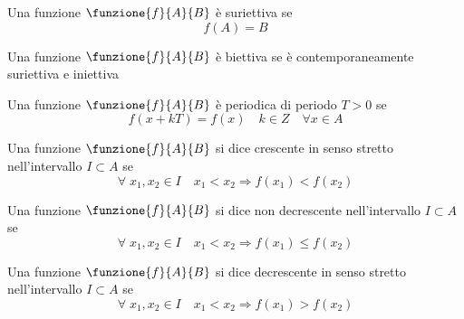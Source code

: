 {\centering
	
	\par}
\begin{defn}\label{defn:funzione-suriettiva}
Una funzione $\funzione{f}{A}{B}$ è suriettiva se
\begin{equation*}
f(A)=B
\end{equation*}
\end{defn}
 {\centering
	
	\par}
\begin{defn}\label{defn:funzione-biettiva}
Una funzione $\funzione{f}{A}{B}$ è biettiva se è contemporaneamente suriettiva e iniettiva
\end{defn}
{\centering
	
	\par}
\begin{defn}\label{defn:funzione-periodica}
	Una funzione $\funzione{f}{A}{B}$ è periodica di periodo $T>0$ se
	\begin{equation*}
	f(x+kT)=f(x)\quad k\in Z\quad\forall x\in A
	\end{equation*}
\end{defn}
\begin{defn}\label{defn:funzione-crescente-in}
Una funzione $\funzione{f}{A}{B}$ si dice crescente in senso stretto nell'intervallo  $I\subset A$ se
\begin{equation*}
\forall\; x_1,x_2\in I\quad x_1< x_2\Longrightarrow f(x_1)<f(x_2)
\end{equation*}
\end{defn}
\begin{defn}\label{defn:funzione-non-decrescente}
Una funzione $\funzione{f}{A}{B}$ si dice non decrescente nell'intervallo  $I\subset A$ se
\begin{equation*}
\forall\; x_1,x_2\in I\quad x_1< x_2\Longrightarrow f(x_1)\leq f(x_2)
\end{equation*}
\end{defn}
\begin{defn}\label{defn:funzione-decrescente-in}
Una funzione $\funzione{f}{A}{B}$ si dice decrescente in senso stretto nell'intervallo  $I\subset A$ se
\begin{equation*}
\forall\; x_1,x_2\in I\quad x_1< x_2\Longrightarrow f(x_1)>f(x_2)
\end{equation*}
\end{defn}
